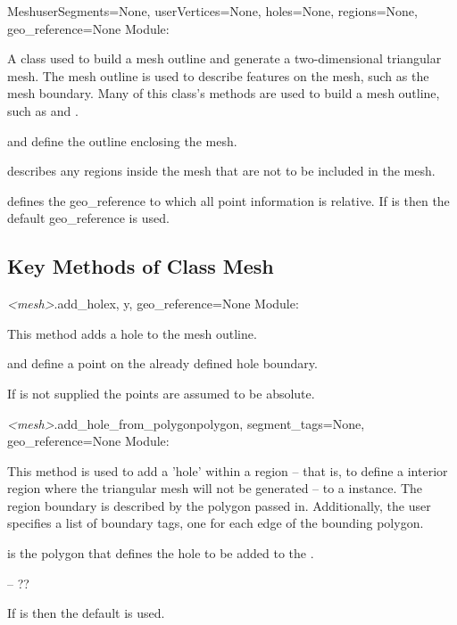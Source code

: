 \documentclass{manual}
\begin{document}
\begin{classdesc}{Mesh}{userSegments=None,
                        userVertices=None,
                        holes=None,
                        regions=None,
                        geo_reference=None}
Module: 

A class used to build a mesh outline and generate a two-dimensional
triangular mesh. The mesh outline is used to describe features on the
mesh, such as the mesh boundary. Many of this class's methods are used
to build a mesh outline, such as  and
.

 and  define the outline enclosing the mesh.

 describes any regions inside the mesh that are not to be included in the mesh.

 defines the geo_reference to which all point information is relative.
If  is  then the default geo_reference is used.
\end{classdesc}

\subsection{Key Methods of Class Mesh}

\begin{methoddesc}{\emph{<mesh>}.add_hole}{x, y, geo_reference=None}
Module: 

This method adds a hole to the mesh outline.

 and  define a point on the already defined hole boundary.

If  is not supplied the points are assumed to be absolute.
\end{methoddesc}

\begin{methoddesc}{\emph{<mesh>}.add_hole_from_polygon}{polygon,
                                                        segment_tags=None,
                                                        geo_reference=None}
Module: 

This method is used to add a 'hole' within a region -- that is, to
define a interior region where the triangular mesh will not be
generated -- to a  instance. The region boundary is described by
the polygon passed in.  Additionally, the user specifies a list of
boundary tags, one for each edge of the bounding polygon.

 is the polygon that defines the hole to be added to the .

 -- ??

If  is  then the default  is used.
\end{methoddesc}
\end{document}

